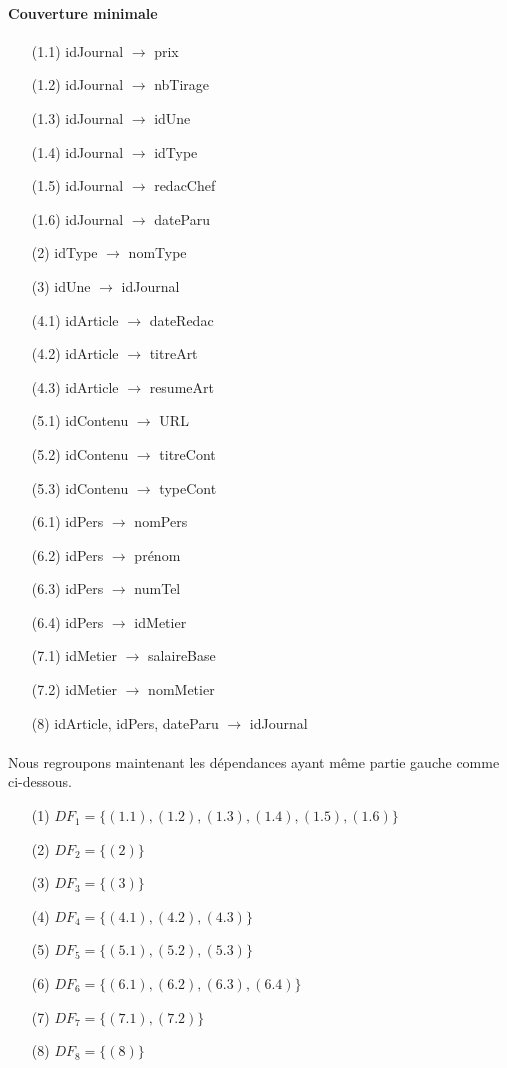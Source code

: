 \paragraph{Couverture minimale}{
\begin{enumerate}
    \item[(1.1)] idJournal $\rightarrow$ prix
    \item[(1.2)] idJournal $\rightarrow$ nbTirage
    \item[(1.3)] idJournal $\rightarrow$ idUne
    \item[(1.4)] idJournal $\rightarrow$ idType
    \item[(1.5)] idJournal $\rightarrow$ redacChef
    \item[(1.6)] idJournal $\rightarrow$ dateParu
    \item[(2)] idType $\rightarrow$ nomType
    \item[(3)] idUne $\rightarrow$ idJournal
    \item[(4.1)] idArticle $\rightarrow$ dateRedac
    \item[(4.2)] idArticle $\rightarrow$ titreArt
    \item[(4.3)] idArticle $\rightarrow$ resumeArt
    \item[(5.1)] idContenu $\rightarrow$ URL
    \item[(5.2)] idContenu $\rightarrow$ titreCont
    \item[(5.3)] idContenu $\rightarrow$ typeCont
    \item[(6.1)] idPers $\rightarrow$ nomPers
    \item[(6.2)] idPers $\rightarrow$ prénom
    \item[(6.3)] idPers $\rightarrow$ numTel
    \item[(6.4)] idPers $\rightarrow$ idMetier
    \item[(7.1)] idMetier $\rightarrow$ salaireBase
    \item[(7.2)] idMetier $\rightarrow$ nomMetier
    \item[(8)] idArticle, idPers, dateParu $\rightarrow$ idJournal
\end{enumerate}}

\paragraph{}{
    Nous regroupons maintenant les dépendances ayant même partie gauche comme ci-dessous.
}
\begin{enumerate}
    \item[(1)] $DF_{1} = \{ (1.1), (1.2), (1.3), (1.4), (1.5), (1.6) \}$
    \item[(2)] $DF_{2} = \{ (2) \}$
    \item[(3)] $DF_{3} = \{ (3) \}$
    \item[(4)] $DF_{4} = \{ (4.1), (4.2), (4.3) \}$
    \item[(5)] $DF_{5} = \{ (5.1), (5.2), (5.3) \}$
    \item[(6)] $DF_{6} = \{ (6.1), (6.2), (6.3), (6.4) \}$
    \item[(7)] $DF_{7} = \{ (7.1), (7.2) \}$
    \item[(8)] $DF_{8} = \{ (8) \}$
\end{enumerate}

